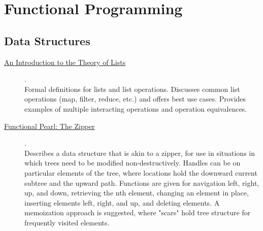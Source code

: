 \chapter {Functional Programming}

\section{Data Structures}

\begin{description}
    \item[\href{https://www.cs.ox.ac.uk/files/3378/PRG56.pdf}{An Introduction to the Theory of Lists}] {\cite{bird1987introduction}.
          \\ Formal definitions for lists and list operations. Discusses common list operations (map, filter, reduce, etc.) and offers best use cases. Provides examples of multiple interacting operations and operation equivalences.
          \\ }
    \item[\href{https://www.st.cs.uni-saarland.de/edu/seminare/2005/advanced-fp/docs/huet-zipper.pdf}{Functional Pearl: The Zipper}] {\cite{huet1997zipper}.
          \\ Describes a data structure that is akin to a zipper, for use in situations in which trees need to be modified non-destructively. Handles can be on particular elements of the tree, where locations hold the downward current subtree and the upward path. Functions are given for navigation left, right, up, and down, retrieving the nth element, changing an element in place, inserting elements left, right, and up, and deleting elements. A memoization approach is suggested, where "scars" hold tree structure for frequently visited elements.
          \\ }
\end{description}
